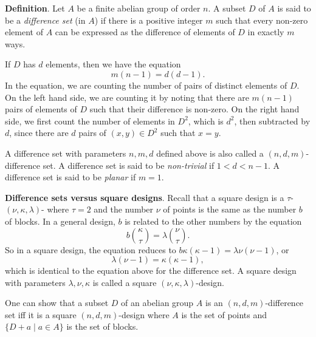 \documentclass[12pt]{article}
\begin{document}
\textbf{Definition}.  Let $A$ be a finite abelian group of order $n$.  A subset $D$ of $A$ is said to be a \emph{difference set} (in $A$) if there is a positive integer $m$ such that every non-zero element of $A$ can be expressed as the difference of elements of $D$ in exactly $m$ ways.  

If $D$ has $d$ elements, then we have the equation $$m(n-1)=d(d-1).$$  In the equation, we are counting the number of pairs of distinct elements of $D$.  On the left hand side, we are counting it by noting that there are $m(n-1)$ pairs of elements of $D$ such that their difference is non-zero.  On the right hand side, we first count the number of elements in $D^2$, which is $d^2$, then subtracted by $d$, since there are $d$ pairs of $(x,y)\in D^2$ such that $x=y$.

A difference set with parameters $n,m,d$ defined above is also called a $(n,d,m)$-difference set.  A difference set is said to be \emph{non-trivial} if $1<d <n-1$.  A difference set is said to be \emph{planar} if $m=1$.

\textbf{Difference sets versus square designs}.  Recall that a square design is a $\tau$-$(\nu,\kappa,\lambda)$- where $\tau=2$ and the number $\nu$ of points is the same as the number $b$ of blocks.  In a general design, $b$ is related to the other numbers by the equation $$b\binom{\kappa}{\tau}=\lambda\binom{\nu}{\tau}.$$  So in a square design, the equation reduces to $b\kappa(\kappa-1)=\lambda\nu(\nu-1)$, or $$\lambda(\nu-1)=\kappa(\kappa-1),$$
which is identical to the equation above for the difference set.  A square design with parameters $\lambda,\nu,\kappa$ is called a square $(\nu,\kappa,\lambda)$-design.  

One can show that a subset $D$ of an abelian group $A$ is an $(n,d,m)$-difference set iff it is a square $(n,d,m)$-design where $A$ is the set of points and $\lbrace D+a\mid a\in A\rbrace$ is the set of blocks.
\end{document}
